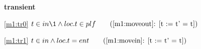 \textbf{transient}
\begin{block}
\item[ \eqref{m1:tr0} ]$t \in in  %
		\1\land loc.t \in plf  \qquad \text{(\ref{m1:moveout}: [t := t' = t])}$ %
\item[ \eqref{m1:tr1} ]$t \in in \land loc.t = ent  \qquad \text{(\ref{m1:movein}: [t := t' = t])}$ %
\end{block}
